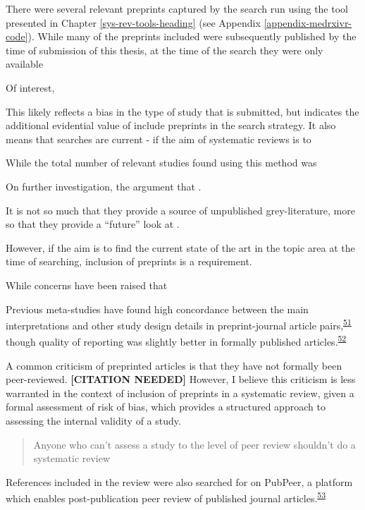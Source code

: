 \documentclass[a4paper, twoside]{templates/ociamthesis}
\begin{document}
There were several relevant preprints captured by the search run using the tool presented in Chapter \ref{sys-rev-tools-heading} (see Appendix \ref{appendix-medrxivr-code}). While many of the preprints included were subsequently published by the time of submission of this thesis, at the time of the search they were only available

Of interest,

This likely reflects a bias in the type of study that is submitted, but indicates the additional evidential value of include preprints in the search strategy. It also means that searches are current - if the aim of systematic reviews is to

While the total number of relevant studies found using this method was

On further investigation, the argument that .

It is not so much that they provide a source of unpublished grey-literature, more so that they provide a ``future'' look at .

However, if the aim is to find the current state of the art in the topic area at the time of searching, inclusion of preprints is a requirement.

While concerns have been raised that

Previous meta-studies have found high concordance between the main interpretations and other study design details in preprint-journal article pairs,\textsuperscript{\protect\hyperlink{ref-shi2021}{51}} though quality of reporting was slightly better in formally published articles.\textsuperscript{\protect\hyperlink{ref-carneiro2020}{52}}

A common criticism of preprinted articles is that they have not formally been peer-reviewed. \textbf{{[}CITATION NEEDED{]}} However, I believe this criticism is less warranted in the context of inclusion of preprints in a systematic review, given a formal assessment of risk of bias, which provides a structured approach to assessing the internal validity of a study.

\begin{quote}
Anyone who can't assess a study to the level of peer review shouldn't do a systematic review
\end{quote}

References included in the review were also searched for on PubPeer, a platform which enables post-publication peer review of published journal articles.\textsuperscript{\protect\hyperlink{ref-hunter2012}{53}}
\end{document}

